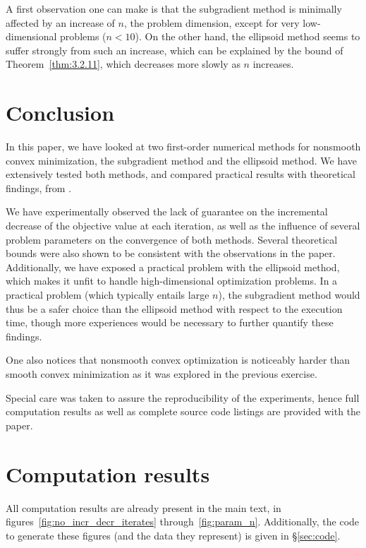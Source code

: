 \documentclass[final]{aomart}
\newtheorem[{}\it]{thm}{Theorem}[section]
\theoremstyle{definition}
\newtheorem*[{}\it]{notation}{Notation}
\numberwithin{equation}{section}
\newcommand{\thmref}[1]{Theorem~\ref{#1}}
\newcommand{\secref}[1]{\S\ref{#1}}
\begin{document}
A first observation one can make is that the subgradient method is minimally affected by an increase of \(n\), the problem dimension, except for very low-dimensional problems (\(n < 10\)).
On the other hand, the ellipsoid method seems to suffer strongly from such an increase, which can be explained by the bound of \thmref{thm:3.2.11}, which decreases more slowly as \(n\) increases.

\section{Conclusion}
\label{sec:conclusion}
In this paper, we have looked at two first-order numerical methods for nonsmooth convex minimization, the subgradient method and the ellipsoid method.
We have extensively tested both methods, and compared practical results with theoretical findings, from \cite{Nesterov2018}.

We have experimentally observed the lack of guarantee on the incremental decrease of the objective value at each iteration, as well as the influence of several problem parameters on the convergence of both methods.
Several theoretical bounds were also shown to be consistent with the observations in the paper.
Additionally, we have exposed a practical problem with the ellipsoid method, which makes it unfit to handle high-dimensional optimization problems.
In a practical problem (which typically entails large \(n\)), the subgradient method would thus be a safer choice than the ellipsoid method with respect to the execution time, though more experiences would be necessary to further quantify these findings.

One also notices that nonsmooth convex optimization is noticeably harder than smooth convex minimization as it was explored in the previous exercise.

Special care was taken to assure the reproducibility of the experiments, hence full computation results as well as complete source code listings are provided with the paper.




\newpage
\appendix

\section{Computation results}
\label{sec:full}
All computation results are already present in the main text, in figures~\ref{fig:no_incr_decr_iterates} through~\ref{fig:param_n}.
Additionally, the code to generate these figures (and the data they represent) is given in \secref{sec:code}.
\end{document}
